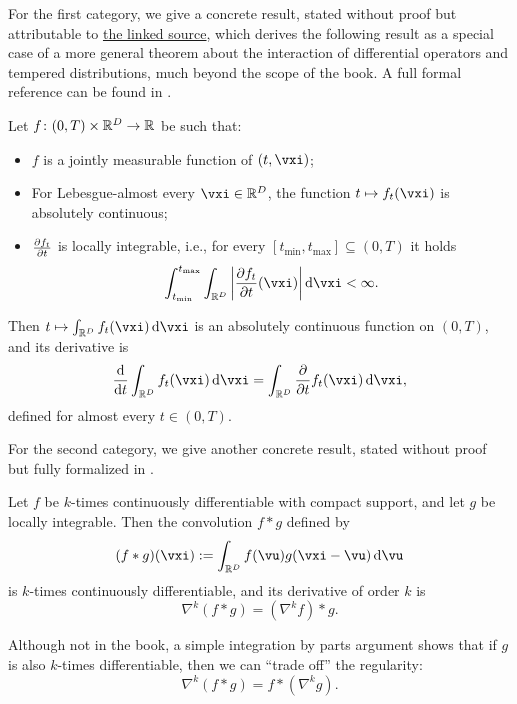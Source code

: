 \documentclass[../../book-main.tex]{subfiles}
\begin{document}
For the first category, we give a concrete result, stated without proof but attributable to \href{https://planetmath.org/differentiationundertheintegralsign}{the linked source}, which derives the following result as a special case of a more general theorem about the interaction of differential operators and tempered distributions, much beyond the scope of the book. A full formal reference can be found in \cite{jones1982theory}.
\begin{proposition}\label{prop:dutis}
    Let \(f \colon (0, T) \times \mathbb{R}^{D} \to \mathbb{R}\) be such that:
    \begin{itemize}
        \item \(f\) is a jointly measurable function of \((t, \vxi)\);
        \item For Lebesgue-almost every \(\vxi \in \R^{D}\), the function \(t \mapsto f_{t}(\vxi)\) is absolutely continuous;
        \item \(\pdv{f_{t}}{t}\) is locally integrable, i.e., for every \([t_{\min}, t_{\max}] \subseteq (0, T)\) it holds 
        \begin{equation}
            \int_{t_{\min}}^{t_{\max}}\int_{\R^{D}}\abs*{\pdv{f_{t}}{t}(\vxi)}\odif{\vxi} < \infty.
        \end{equation}
    \end{itemize}
    Then \(t \mapsto \int_{\R^{D}}f_{t}(\vxi)\odif{\vxi}\) is an absolutely continuous function on \((0, T)\), and its derivative is 
    \begin{equation}
        \odv*{\int_{\R^{D}}f_{t}(\vxi)\odif{\vxi}}{t} = \int_{\R^{D}}\pdv*{f_{t}}{t}(\vxi)\odif{\vxi},
    \end{equation}
    defined for almost every \(t \in (0, T)\).
\end{proposition}

For the second category, we give another concrete result, stated without proof but fully formalized in \cite{brezis2011functional}.
\begin{proposition}\label{prop:diff_convolution}
    Let \(f\) be \(k\)-times continuously differentiable with compact support, and let \(g\) be locally integrable. Then the convolution \(f * g\) defined by
    \begin{equation}
        (f * g)(\vxi) := \int_{\R^{D}}f(\vu)g(\vxi - \vu)\odif{\vu}
    \end{equation}
    is \(k\)-times continuously differentiable, and its derivative of order \(k\) is 
    \begin{equation}
        \nabla^{k}(f * g) =(\nabla^{k}f) * g. 
    \end{equation}
\end{proposition}
Although not in the book, a simple integration by parts argument shows that if \(g\) is also \(k\)-times differentiable, then we can ``trade off'' the regularity:
\begin{equation}
    \nabla^{k}(f * g) = f * (\nabla^{k} g).
\end{equation}
\end{document}
